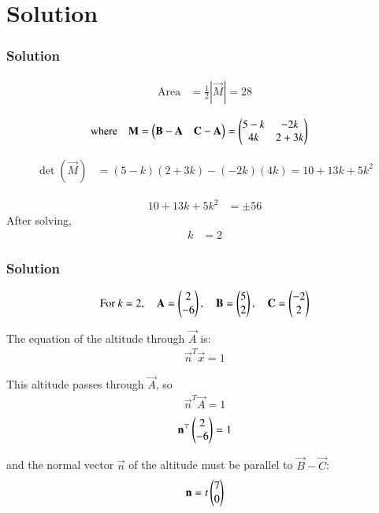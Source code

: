 \documentclass{beamer}
\numberwithin{equation}{section}
\begin{document}
\section{Solution}
\begin{frame}[fragile]
    \frametitle{Solution}
\begin{align}
\text{Area} &= \frac{1}{2} \left| \vec{M} \right| = 28
\end{align}

\begin{align}
\text{where} \quad
\mathbf{M} &= \begin{pmatrix}
\mathbf{B} - \mathbf{A} & \mathbf{C} - \mathbf{A}
\end{pmatrix}
= \begin{pmatrix}
5-k & -2k \\
4k & 2 + 3k
\end{pmatrix}
\end{align}

\begin{align}
\det(\vec{M}) &= (5-k)(2+3k) - (-2k)(4k) = 10 + 13k + 5k^2
\end{align}

\begin{align}
10 + 13k + 5k^2 &= \pm 56
\end{align}
After solving,
\begin{align}
k &= 2
\end{align}

\end{frame}
\begin{frame}[fragile]
    \frametitle{Solution}
\begin{align}
\text{For } k=2, \quad \mathbf{A} = \begin{pmatrix}2 \\ -6\end{pmatrix}, \quad \mathbf{B} = \begin{pmatrix}5 \\ 2\end{pmatrix}, \quad \mathbf{C} = \begin{pmatrix}-2 \\ 2\end{pmatrix}
\end{align}

The equation of the altitude through \( \vec{A} \) is:
\begin{align}
\vec{n}^T \vec{x} = 1
\end{align}

This altitude passes through \( \vec{A} \), so
\begin{align}
\vec{n}^T \vec{A} = 1
\end{align}
\begin{align}
\mathbf{n}^\top \begin{pmatrix}2 \\ -6\end{pmatrix} = 1
\end{align}

and the normal vector \( \vec{n} \) of the altitude must be parallel to \( \vec{B} - \vec{C} \):
\begin{align}
\mathbf{n} = t \begin{pmatrix}7 \\ 0\end{pmatrix}
\end{align}
\end{frame}
\end{document}

